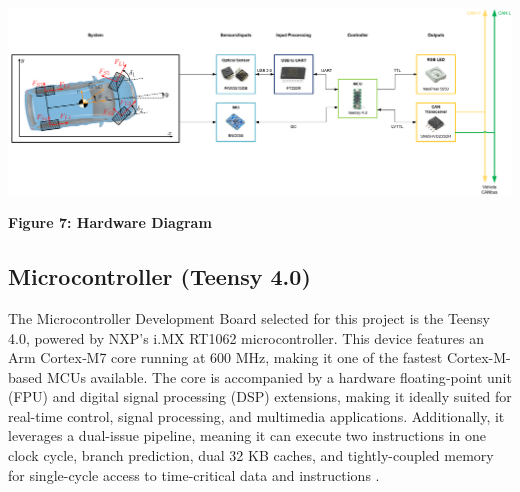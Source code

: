 \documentclass[12pt]{article}
\begin{document}
        \begin{center}
            \vspace{0.5cm}

            \includegraphics[width=1\textwidth]{resources/Screenshot 2025-04-27 181552.png}

            \vspace{0.5cm}

            \textbf{Figure 7: Hardware Diagram}
            \label{hd}
        
        \end{center}





        
        
        \subsection{Microcontroller (Teensy 4.0)}

            The Microcontroller Development Board selected for this project is the Teensy 4.0, powered by NXP’s i.MX RT1062 microcontroller. This device 
            features an Arm Cortex‑M7 core running at 600 MHz, making it one of the fastest Cortex-M-based MCUs available. The core is accompanied by a 
            hardware floating‑point unit (FPU) and digital signal processing (DSP) extensions, making it ideally suited for real-time control, signal 
            processing, and multimedia applications. Additionally, it leverages a dual-issue pipeline, meaning it can execute two instructions in one 
            clock cycle, branch prediction, dual 32 KB caches, and tightly-coupled memory for single-cycle access to time-critical data and instructions 
            \autocite{PJRC}. 
\end{document}
